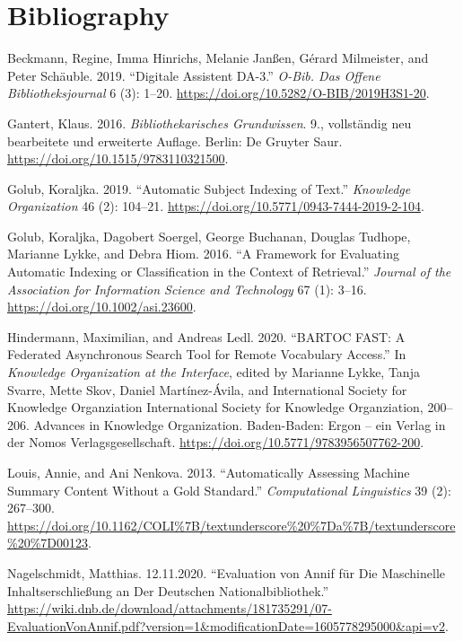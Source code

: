 \hypertarget{bibliography}{%
\section{Bibliography}\label{bibliography}}

\hypertarget{refs}{}
\begin{CSLReferences}{1}{0}
\leavevmode\hypertarget{ref-Beckmann.2019}{}%
Beckmann, Regine, Imma Hinrichs, Melanie Janßen, Gérard Milmeister, and
Peter Schäuble. 2019. {``Digitale Assistent DA-3.''} \emph{O-Bib. Das
Offene Bibliotheksjournal} 6 (3): 1--20.
\url{https://doi.org/10.5282/O-BIB/2019H3S1-20}.

\leavevmode\hypertarget{ref-Gantert.2016}{}%
Gantert, Klaus. 2016. \emph{Bibliothekarisches Grundwissen}. 9.,
vollst{ä}ndig neu bearbeitete und erweiterte Auflage. Berlin: {De
Gruyter Saur}. \url{https://doi.org/10.1515/9783110321500}.

\leavevmode\hypertarget{ref-Golub.2019}{}%
Golub, Koraljka. 2019. {``Automatic Subject Indexing of Text.''}
\emph{Knowledge Organization} 46 (2): 104--21.
\url{https://doi.org/10.5771/0943-7444-2019-2-104}.

\leavevmode\hypertarget{ref-Golub.2016}{}%
Golub, Koraljka, Dagobert Soergel, George Buchanan, Douglas Tudhope,
Marianne Lykke, and Debra Hiom. 2016. {``A Framework for Evaluating
Automatic Indexing or Classification in the Context of Retrieval.''}
\emph{Journal of the Association for Information Science and Technology}
67 (1): 3--16. \url{https://doi.org/10.1002/asi.23600}.

\leavevmode\hypertarget{ref-Hindermann.2020}{}%
Hindermann, Maximilian, and Andreas Ledl. 2020. {``BARTOC FAST: A
Federated Asynchronous Search Tool for Remote Vocabulary Access.''} In
\emph{Knowledge Organization at the Interface}, edited by Marianne
Lykke, Tanja Svarre, Mette Skov, Daniel Martínez-Ávila, and
International Society for Knowledge Organziation International Society
for Knowledge Organziation, 200--206. Advances in Knowledge
Organization. Baden-Baden: {Ergon -- ein Verlag in der Nomos
Verlagsgesellschaft}. \url{https://doi.org/10.5771/9783956507762-200}.

\leavevmode\hypertarget{ref-Louis.2013}{}%
Louis, Annie, and Ani Nenkova. 2013. {``Automatically Assessing Machine
Summary Content Without a Gold Standard.''} \emph{Computational
Linguistics} 39 (2): 267--300.
\url{https://doi.org/10.1162/COLI\%7B/textunderscore\%20\%7Da\%7B/textunderscore\%20\%7D00123}.

\leavevmode\hypertarget{ref-Nagelschmidt.12.11.2020}{}%
Nagelschmidt, Matthias. 12.11.2020. {``Evaluation von Annif f{ü}r Die
Maschinelle Inhaltserschlie{ß}ung an Der Deutschen
Nationalbibliothek.''}
\url{https://wiki.dnb.de/download/attachments/181735291/07-EvaluationVonAnnif.pdf?version=1\&modificationDate=1605778295000\&api=v2}.


\end{CSLReferences}
